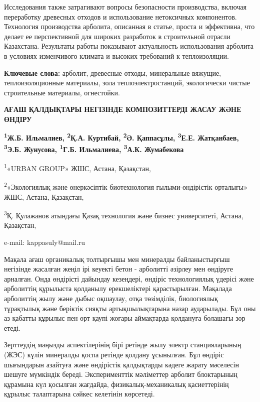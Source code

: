 Исследования также затрагивают вопросы безопасности производства,
включая переработку древесных отходов и использование нетоксичных
компонентов. Технология производства арболита, описанная в статье,
проста и эффективна, что делает ее перспективной для широких разработок
в строительной отрасли Казахстана. Результаты работы показывают
актуальность использования арболита в условиях изменчивого климата и
высоких требований к теплоизоляции.

{\bfseries Ключевые слова:} арболит, древесные отходы, минеральные вяжущие,
теплоизоляционные материалы, зола теплоэлектростанций, экологически
чистые строительные материалы, огнестойки.

\begin{articleheader}
{\bfseries АҒАШ ҚАЛДЫҚТАРЫ НЕГІЗІНДЕ КОМПОЗИТТЕРДІ ЖАСАУ ЖӘНЕ ӨНДІРУ}

{\bfseries
\textsuperscript{1}Ж.Б. Ильмалиев,
\textsuperscript{2}Қ.А. Куртибай,
\textsuperscript{2}Ә. Қаппасұлы\textsuperscript{\envelope },
\textsuperscript{3}Е.Е. Жатқанбаев,
\textsuperscript{3}Э.Б. Жунусова,
\textsuperscript{1}Г.Б. Ильмалиева,
\textsuperscript{3}А.К. Жумабекова
}
\end{articleheader}

\begin{affiliation}
\textsuperscript{1}«URBAN GROUP» ЖШС, Астана, Қазақстан,

\textsuperscript{2}«Экологиялық және өнеркәсіптік биотехнология ғылыми-өндірістік орталығы» ЖШС, Астана, Қазақстан,

\textsuperscript{3}Қ. Қулажанов атындағы Қазақ технология және бизнес университеті, Астана, Қазақстан,

e-mail: kappasuly@mail.ru
\end{affiliation}

Мақала ағаш органикалық толтырғышы мен минералды байланыстырғыш
негізінде жасалған жеңіл ірі кеуекті бетон - арболитті әзірлеу мен
өндіруге арналған. Онда өндірісті дайындау кезеңдері, өндіріс
технологиялық үдерісі және арболиттің құрылыста қолданылу ерекшеліктері
қарастырылған. Мақалада арболиттің жылу және дыбыс оқшаулау, отқа
төзімділік, биологиялық тұрақтылық және беріктік сияқты артықшылықтарына
назар аударылады. Бұл оны аз қабатты құрылыс пен өрт қаупі жоғары
аймақтарда қолдануға болашағы зор етеді.

Зерттеудің маңызды аспектілерінің бірі ретінде жылу электр
станцияларының (ЖЭС) күлін минералды қоспа ретінде қолдану ұсынылған.
Бұл өндіріс шығындарын азайтуға және өндірістік қалдықтарды кәдеге
жарату мәселесін шешуге мүмкіндік береді. Эксперименттік мәліметтер
арболит блоктарының құрамына күл қосылған жағдайда,
физикалық-механикалық қасиеттерінің құрылыс талаптарына сәйкес келетінін
көрсетеді.

